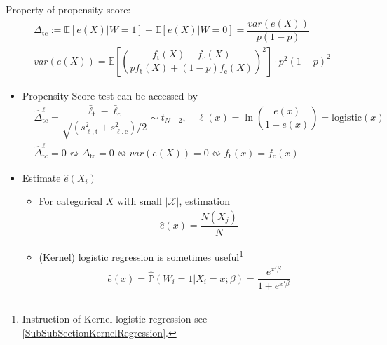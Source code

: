 Property of propensity score:
\begin{align*}
    \Delta _\mathrm{tc}:= \mathbb{E}\left[ e(X)|W=1 \right] - \mathbb{E}\left[ e(X) |W=0\right]=\dfrac{var(e(X))}{p(1-p)}\\
    var(e(X))=\mathbb{E}\left[ \left(\dfrac{f_\mathrm{t}(X)-f_\mathrm{c}(X)  }{pf_\mathrm{t}(X)+(1-p)f_\mathrm{c}(X)}\right)^2 \right]\cdot p^2(1-p)^2   
\end{align*}
\begin{itemize}[topsep=2pt,itemsep=0pt]
    \item Propensity Score test can be accessed by
\begin{align*}
    &\hat{\Delta }_\mathrm{tc}^\ell = \dfrac{\bar{\ell}_\mathrm{t}-\bar{\ell}_\mathrm{c}  }{\sqrt{(s^2_{\ell,\mathrm{t} }+s^2_{\ell,\mathrm{c} } )/2}}\sim t_{N-2},\quad \ell(x)=\ln\left(\dfrac{e(x)}{1-e(x)}\right)=\mathrm{logistic}(x) \\
    &\hat{\Delta }_\mathrm{tc}^\ell =0\leftrightsquigarrow \Delta _\mathrm{tc}=0\leftrightsquigarrow var(e(X))=0\leftrightsquigarrow f_\mathrm{t}(x)=f_\mathrm{c}(x)  
\end{align*}
    \item Estimate $ \hat{e}(X_i) $
    \begin{itemize}[topsep=2pt,itemsep=0pt]
        \item For categorical $ X $ with small $ |\mathcal{X}| $, estimation
        \begin{align*}
            \hat{e}(x)=\dfrac{N(X_j)}{N} 
        \end{align*}
        \item (Kernel) logistic regression is sometimes useful\footnote{Instruction of Kernel logistic regression see \autoref{SubSubSectionKernelRegression}.}
        \begin{align*}
             \hat{e}(x)=\hat{\mathbb{P}}\left( W_i=1|X_i=x;\beta  \right)=\dfrac{e^{x'\beta }}{1+e^{x'\beta }} 
        \end{align*}
    \end{itemize}
    
\end{itemize}

    







